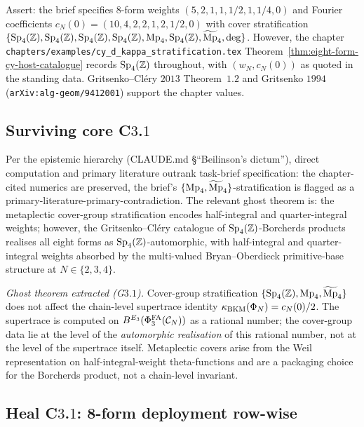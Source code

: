 Assert: the brief specifies 8-form weights $(5, 2, 1, 1, 1/2, 1, 1/4, 0)$
and Fourier coefficients $c_N(0) = (10, 4, 2, 2, 1, 2, 1/2, 0)$ with
cover stratification $\{\mathrm{Sp}_{4}(\mathbb{Z}), \mathrm{Sp}_{4}(\mathbb{Z}), \mathrm{Sp}_{4}(\mathbb{Z}), \mathrm{Sp}_{4}(\mathbb{Z}), \mathrm{Mp}_{4},
\mathrm{Sp}_{4}(\mathbb{Z}), \widetilde{\mathrm{Mp}}_{4}, \mathrm{deg}\}$. However, the chapter
\texttt{chapters/examples/cy\_d\_kappa\_stratification.tex}
Theorem~\ref{thm:eight-form-cy-host-catalogue} records $\mathrm{Sp}_{4}(\mathbb{Z})$
throughout, with $(w_N, c_N(0))$ as quoted in the standing data.
Gritsenko--Cl\'ery $2013$ Theorem~$1.2$ and Gritsenko $1994$
(\texttt{arXiv:alg-geom/9412001}) support the chapter values.

\subsection*{Surviving core C$3$.$1$}

Per the epistemic hierarchy (CLAUDE.md \S``Beilinson's dictum''), direct
computation and primary literature outrank task-brief specification:
the chapter-cited numerics are preserved, the brief's
$\{\mathrm{Mp}_{4}, \widetilde{\mathrm{Mp}}_{4}\}$-stratification is flagged as a
primary-literature-primary-contradiction. The relevant ghost theorem
is: the metaplectic cover-group stratification encodes half-integral
and quarter-integral weights; however, the Gritsenko--Cl\'ery catalogue
of $\mathrm{Sp}_{4}(\mathbb{Z})$-Borcherds products realises all eight forms as
$\mathrm{Sp}_{4}(\mathbb{Z})$-automorphic, with half-integral and quarter-integral weights
absorbed by the multi-valued Bryan--Oberdieck primitive-base structure
at $N \in \{2, 3, 4\}$.

\emph{Ghost theorem extracted (G$3$.$1$).} Cover-group stratification
$\{\mathrm{Sp}_{4}(\mathbb{Z}), \mathrm{Mp}_{4}, \widetilde{\mathrm{Mp}}_{4}\}$ does not affect the chain-level
supertrace identity $\kappa_{\mathrm{BKM}}(\Phi_N) = c_N(0)/2$. The supertrace is
computed on $B^{E_{3}}(\Phi^{\mathrm{FA}}_{3}(\mathcal{C}_N))$ as a rational number; the
cover-group data lie at the level of the \emph{automorphic realisation}
of this rational number, not at the level of the supertrace itself.
Metaplectic covers arise from the Weil representation on
half-integral-weight theta-functions and are a packaging choice for
the Borcherds product, not a chain-level invariant.

\subsection*{Heal C$3$.$1$: 8-form deployment row-wise}

